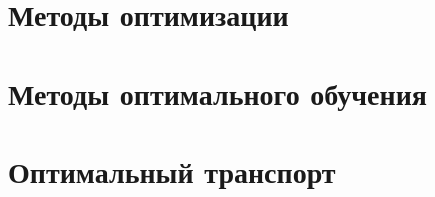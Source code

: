 \label{math_chapter}


\section{Методы оптимизации}



\section{Методы оптимального обучения}



\section{Оптимальный транспорт}


